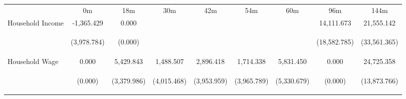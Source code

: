 \begin{tabular}{lcccccccc}
\hline \noalign{\smallskip} & 0m & 18m & 30m & 42m & 54m & 60m & 96m & 144m\\
\noalign{\smallskip}\hline \noalign{\smallskip}Household Income & -1,365.429 & 0.000 &  &  &  &  & 14,111.673 & 21,555.142\\
 & \begin{footnotesize}(3,978.784)\end{footnotesize} & \begin{footnotesize}(0.000)\end{footnotesize} & \begin{footnotesize}\end{footnotesize} & \begin{footnotesize}\end{footnotesize} & \begin{footnotesize}\end{footnotesize} & \begin{footnotesize}\end{footnotesize} & \begin{footnotesize}(18,582.785)\end{footnotesize} & \begin{footnotesize}(33,561.365)\end{footnotesize}\\
\noalign{\smallskip}Household Wage & 0.000 & 5,429.843 & 1,488.507 & 2,896.418 & 1,714.338 & 5,831.450 & 0.000 & 24,725.358\\
 & \begin{footnotesize}(0.000)\end{footnotesize} & \begin{footnotesize}(3,379.986)\end{footnotesize} & \begin{footnotesize}(4,015.468)\end{footnotesize} & \begin{footnotesize}(3,953.959)\end{footnotesize} & \begin{footnotesize}(3,965.789)\end{footnotesize} & \begin{footnotesize}(5,330.679)\end{footnotesize} & \begin{footnotesize}(0.000)\end{footnotesize} & \begin{footnotesize}(13,873.766)\end{footnotesize}\\

\end{tabular}
